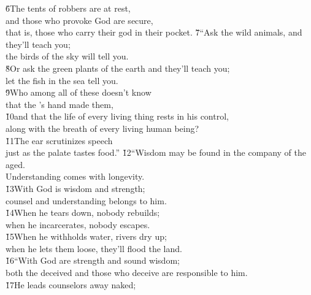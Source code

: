 \begin{poetry}
\poeml \v{6}The tents of robbers are at rest, \\
\poemll    and those who provoke God are secure, \\
\poemlll       that is, those who carry their god in their pocket.
\poeml \v{7}``Ask the wild animals, and they'll teach you; \\
\poemll    the birds of the sky will tell you. \\
\poeml \v{8}Or ask the green plants of the earth and they'll teach you; \\
\poemll    let the fish in the sea tell you. \\
\poeml \v{9}Who among all of these doesn't know \\
\poemll    that the 's hand made them, \\
\poeml \v{10}and that the life of every living thing rests in his control, \\
\poemll    along with the breath of every living human being? \\
\poeml \v{11}The ear scrutinizes speech \\
\poemll    just as the palate tastes food.''
\poeml \v{12}``Wisdom may be found in the company of the aged. \\
\poemll    Understanding comes with longevity. \\
\poeml \v{13}With God is wisdom and strength; \\
\poemll    counsel and understanding belongs to him. \\
\poeml \v{14}When he tears down, nobody rebuilds; \\
\poemll    when he incarcerates, nobody escapes. \\
\poeml \v{15}When he withholds water, rivers dry up; \\
\poemll    when he lets them loose, they'll flood the land. \\
\poeml \v{16}``With God are strength and sound wisdom; \\
\poemll    both the deceived and those who deceive are responsible to him. \\
\poeml \v{17}He leads counselors away naked; \\

\end{poetry}
